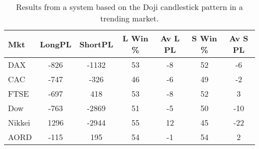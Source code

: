 \begin{table}[ht]
\centering
\caption[Results from a system based on the Doji candlestick pattern in a trending market]{Results from a system based on the Doji candlestick pattern in a trending market.} 
\label{tab:doji_aroon_results}
\begin{tabular}{lcccccc}
  \toprule Mkt & LongPL & ShortPL & L Win \% & Av L PL & S Win \% & Av S PL \\ 
  \midrule DAX & -826 & -1132 & 53 & -8 & 52 & -6 \\ 
  CAC & -747 & -326 & 46 & -6 & 49 & -2 \\ 
  FTSE & -697 & 418 & 53 & -8 & 52 & 3 \\ 
  Dow & -763 & -2869 & 51 & -5 & 50 & -10 \\ 
  Nikkei & 1296 & -2944 & 55 & 12 & 45 & -22 \\ 
  AORD & -115 & 195 & 54 & -1 & 54 & 2 \\ 
   \bottomrule \end{tabular}
\end{table}
